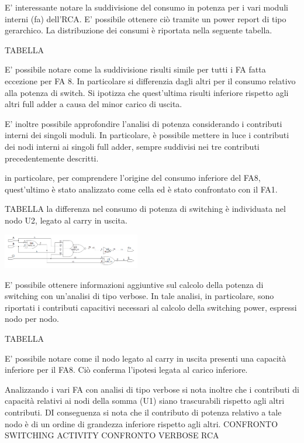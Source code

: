 E' interessante notare la suddivisione del consumo in potenza per i vari moduli interni (fa) dell'RCA. E' possibile ottenere ciò tramite un power report di tipo gerarchico. La distribuzione dei consumi è riportata nella seguente tabella.

TABELLA

E' possibile notare come la suddivisione risulti simile per tutti i FA fatta eccezione per FA 8. In particolare si differenzia dagli altri per il consumo relativo alla potenza di switch. Si ipotizza che quest'ultima risulti inferiore rispetto agli altri full adder a causa del minor carico di uscita.

E' inoltre possibile approfondire l'analisi di potenza considerando i contributi interni dei singoli moduli. In particolare, è possibile mettere in luce i contributi dei nodi interni ai singoli full adder, sempre suddivisi nei tre contributi precedentemente descritti.

in particolare, per comprendere l'origine del consumo inferiore del FA8, quest'ultimo è stato analizzato come cella ed è stato confrontato con il FA1.

TABELLA
la differenza nel consumo di potenza di switching è individuata nel nodo U2, legato al carry in uscita.

\includegraphics[width=6cm]{./img/Lab_1/Es_3/Full_adder.png}

E' possibile ottenere informazioni aggiuntive sul calcolo della potenza di switching con un'analisi di tipo verbose. In tale analisi, in particolare, sono riportati i contributi capacitivi necessari al calcolo della switching power, espressi nodo per nodo.

TABELLA

E' possibile notare come il nodo legato al carry in uscita presenti una capacità inferiore per il FA8. Ciò conferma l'ipotesi legata al carico inferiore.

Analizzando i vari FA con analisi di tipo verbose si nota inoltre che i contributi di capacità relativi ai nodi della somma (U1) siano trascurabili rispetto agli altri contributi.
DI conseguenza si nota che il contributo di potenza relativo a tale nodo è di un ordine di grandezza inferiore rispetto agli altri.
CONFRONTO SWITCHING ACTIVITY
CONFRONTO VERBOSE RCA

